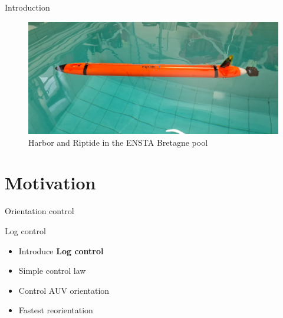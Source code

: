\documentclass[10pt, xcolor={usenames, dvipsnames}]{beamer}
\begin{document}
\begin{frame}{Introduction}
\begin{minipage}[c]{0.4\textwidth}
\begin{figure}[htb]
                    \vspace{.1cm}

                    \includegraphics[width=\textwidth]{imgs/Riptide.jpeg}
                    \caption{Harbor and Riptide in the ENSTA Bretagne pool}
                \end{figure}
            \end{minipage}
        \end{frame}

    \section{Motivation}

        \begin{frame}{Orientation control}
            \centering
            \begin{minipage}[c]{0.6\textwidth}
                \begin{block}{Log control}
                    \begin{itemize}
                        \vspace{0.25cm}
                        \item Introduce \textbf{Log control}
                        \item Simple control law \\
                        \item Control AUV orientation \\
                        \item Fastest reorientation
                    \end{itemize}
                \end{block}
            \end{minipage}
        \end{frame}
\end{document}
